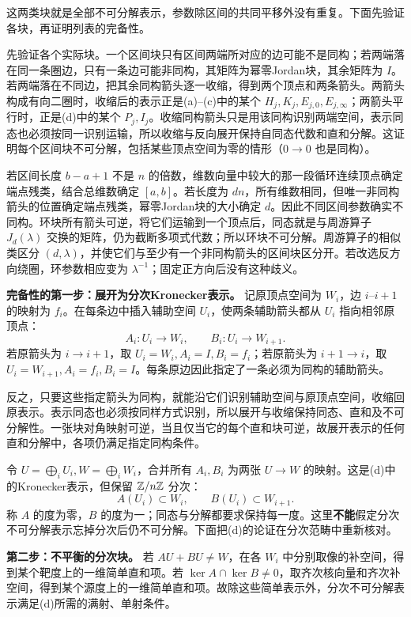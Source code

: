 \begin{solution}
这两类块就是全部不可分解表示，参数除区间的共同平移外没有重复。下面先验证各块，再证明列表的完备性。

先验证各个实际块。一个区间块只有区间两端所对应的边可能不是同构；若两端落在同一条圈边，只有一条边可能非同构，其矩阵为幂零Jordan块，其余矩阵为 $I$。若两端落在不同边，把其余同构箭头逐一收缩，得到两个顶点和两条箭头。两箭头构成有向二圈时，收缩后的表示正是(a)--(c)中的某个 $H_j,K_j,E_{j,0},E_{j,\infty}$；两箭头平行时，正是(d)中的某个 $P_j,I_j$。收缩同构箭头只是用该同构识别两端空间，表示同态也必须按同一识别运输，所以收缩与反向展开保持自同态代数和直和分解。这证明每个区间块不可分解，包括某些顶点空间为零的情形（$0\to0$ 也是同构）。

若区间长度 $b-a+1$ 不是 $n$ 的倍数，维数向量中较大的那一段循环连续顶点确定端点残类，结合总维数确定 $[a,b]$。若长度为 $dn$，所有维数相同，但唯一非同构箭头的位置确定端点残类，幂零Jordan块的大小确定 $d$。因此不同区间参数确实不同构。环块所有箭头可逆，将它们运输到一个顶点后，同态就是与周游算子 $J_d(\lambda)$ 交换的矩阵，仍为截断多项式代数；所以环块不可分解。周游算子的相似类区分 $(d,\lambda)$，并使它们与至少有一个非同构箭头的区间块区分开。若改选反方向绕圈，环参数相应变为 $\lambda^{-1}$；固定正方向后没有这种歧义。

\textbf{完备性的第一步：展开为分次Kronecker表示。}
记原顶点空间为 $W_i$，边 $i$--$i+1$ 的映射为 $f_i$。在每条边中插入辅助空间 $U_i$，使两条辅助箭头都从 $U_i$ 指向相邻原顶点：
\[
 A_i:U_i\to W_i,\qquad B_i:U_i\to W_{i+1}.
\]
若原箭头为 $i\to i+1$，取 $U_i=W_i,A_i=I,B_i=f_i$；若原箭头为 $i+1\to i$，取 $U_i=W_{i+1},A_i=f_i,B_i=I$。每条原边因此指定了一条必须为同构的辅助箭头。

反之，只要这些指定箭头为同构，就能沿它们识别辅助空间与原顶点空间，收缩回原表示。表示同态也必须按同样方式识别，所以展开与收缩保持同态、直和及不可分解性。一张块对角映射可逆，当且仅当它的每个直和块可逆，故展开表示的任何直和分解中，各项仍满足指定同构条件。

令 $U=\bigoplus_iU_i,W=\bigoplus_iW_i$，合并所有 $A_i,B_i$ 为两张 $U\to W$ 的映射。这是(d)中的Kronecker表示，但保留 $\mathbb Z/n\mathbb Z$ 分次：
\[
 A(U_i)\subset W_i,\qquad B(U_i)\subset W_{i+1}.
\]
称 $A$ 的度为零，$B$ 的度为一；同态与分解都要求保持每一度。这里\textbf{不能}假定分次不可分解表示忘掉分次后仍不可分解。下面把(d)的论证在分次范畴中重新核对。

\textbf{第二步：不平衡的分次块。}
若 $AU+BU\ne W$，在各 $W_i$ 中分别取像的补空间，得到某个靶度上的一维简单直和项。若 $\ker A\cap\ker B\ne0$，取齐次核向量和齐次补空间，得到某个源度上的一维简单直和项。故除这些简单表示外，分次不可分解表示满足(d)所需的满射、单射条件。


\end{solution}
